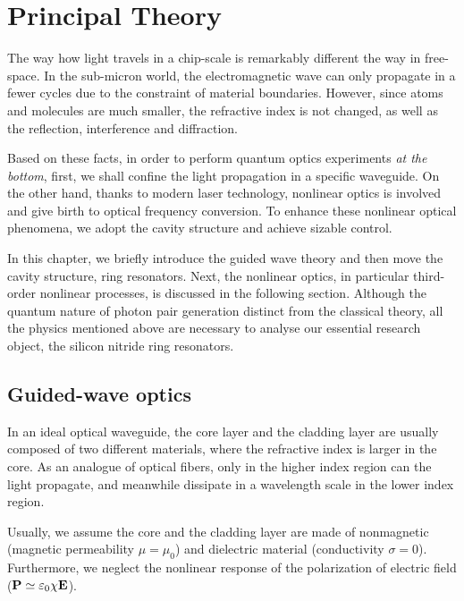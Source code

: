 \chapter{Principal Theory}

The way how light travels in a chip-scale is remarkably different the way in free-space. In the sub-micron world, the electromagnetic wave can only propagate in a fewer cycles due to the constraint of material boundaries. However, since atoms and molecules are much smaller, the refractive index is not changed, as well as the reflection, interference and diffraction. 

Based on these facts, in order to perform quantum optics experiments \textit{at the bottom}, first, we shall confine the light propagation in a specific waveguide. On the other hand, thanks to modern laser technology, nonlinear optics is involved and give birth to optical frequency conversion. To enhance these nonlinear optical phenomena, we adopt the cavity structure and achieve sizable control.

In this chapter, we briefly introduce the guided wave theory and then move the cavity structure, ring resonators. Next, the nonlinear optics, in particular third-order nonlinear processes, is discussed in the following section. Although the quantum nature of photon pair generation distinct from the classical theory, all the physics mentioned above are necessary to analyse our essential research object, the silicon nitride ring resonators.


\section{Guided-wave optics}\label{sec:guide}

In an ideal optical waveguide, the core layer and the cladding layer are usually composed of two different materials, where the refractive index is larger in the core. As an analogue of optical fibers, only in the higher index region can the light propagate, and meanwhile dissipate in a wavelength scale in the lower index region.

Usually, we assume the core and the cladding layer are made of nonmagnetic (magnetic permeability $\mu = \mu_0$) and dielectric material (conductivity $\sigma = 0$). Furthermore, we neglect the nonlinear response of the polarization of electric field ($\vb{P} \simeq \varepsilon_0 \chi \vb{E}$).


